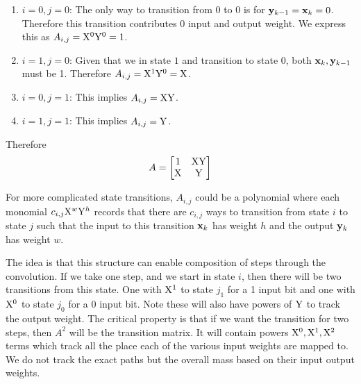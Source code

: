 \begin{enumerate}
    \item $i=0,j=0$: The only way to transition from 0 to 0 is for $\mathbf{y}_{k-1}=\mathbf{x}_k=0$. Therefore this transition contributes 0 input and output weight. We express this as $A_{i,j}=\mathrm{X}^0\mathrm{Y}^0=1$.
    \item $i=1,j=0$: Given that we in state $1$ and transition to state 0, both $\mathbf{x}_k,\mathbf{y}_{k-1}$ must be 1. Therefore $A_{i,j}=\mathrm{X}^1\mathrm{Y}^0=\mathrm{X}$.
    \item $i=0,j=1$: This implies $A_{i,j}=\mathrm{X}\mathrm{Y}$.
    \item $i=1,j=1$: This implies $A_{i,j}=\mathrm{Y}$.
\end{enumerate}
Therefore
$$
A = \begin{bmatrix}
    1&\mathrm{X}\mathrm{Y}\\
    \mathrm{X}&\mathrm{Y}
\end{bmatrix}
$$

For more complicated state transitions, $A_{i,j}$ could be a polynomial where each monomial $c_{i,j}\mathrm{X}^w\mathrm{Y}^h$ records that there are $c_{i,j}$ ways to transition from state $i$ to state $j$ such that the input to this transition $\mathbf{x}_k$ has weight $h$ and the output $\mathbf{y}_k$ has weight $w$. 


The idea is that this structure can enable composition of steps through the convolution. If we take one step, and we start in state $i$, then there will be two transitions from this state. One with $\mathrm{X}^1$ to state $j_1$ for a 1 input bit and one with $\mathrm{X}^0$ to state $j_0$ for a 0 input bit. Note these will also have powers of $\mathrm{Y}$ to track the output weight. The critical property is that if we want the transition for two steps, then $A^2$ will be the transition matrix. It will contain powers $\mathrm{X}^0,\mathrm{X}^1,\mathrm{X}^2$ terms which track all the place each of the various input weights are mapped to. We do not track the exact paths but the overall mass based on their input output weights. 

